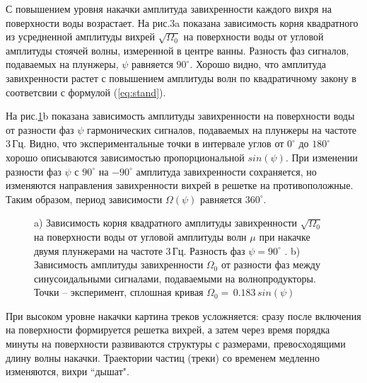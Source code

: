 С повышением уровня накачки амплитуда завихренности каждого вихря на поверхности воды возрастает. На рис.3a показана зависимость корня квадратного из усредненной амплитуды вихрей $\sqrt{\Omega_0}$ на поверхности воды от угловой амплитуды стоячей волны, измеренной в центре ванны. Разность фаз сигналов, подаваемых на плунжеры, $\psi$ равняется $90^\circ$. Хорошо видно, что амплитуда завихренности растет с повышением амплитуды волн по квадратичному закону в соответсвии с формулой (\ref{eq:stand}). 

На рис.\ref{img:ampl_phase}b показана зависимость амплитуды завихренности на поверхности воды от разности фаз $\psi$ гармонических сигналов, подаваемых на плунжеры на частоте 3\,Гц. Видно, что экспериментальные точки в интервале углов от $0^\circ$ до $180^\circ$ хорошо описываются зависимостью пропорциональной $sin(\psi)$. При изменении разности фаз $\psi$ с $90^\circ$ на $-90^\circ$ амплитуда завихренности сохраняется, но изменяются направления завихренности вихрей в решетке на противоположные. Таким образом, период зависимости $\Omega (\psi)$ равняется $360^\circ$. 

\begin{figure}[ht]
  \begin{minipage}[ht]{0.49\linewidth}
  \end{minipage}
  \hfill
  \begin{minipage}[ht]{0.49\linewidth}
  \end{minipage}
  \caption{a) Зависимость корня квадратного амплитуды завихренности $\sqrt{\Omega_0}$ на поверхности воды от угловой амплитуды волн $\mu$ при накачке двумя плунжерами на частоте 3\,Гц. Разность фаз $\psi=90^\circ$ . b) Зависимость амплитуды завихренности $\Omega_0$ от разности фаз между синусоидальными сигналами, подаваемыми на волнопродукторы. Точки – эксперимент, сплошная кривая $\Omega_0 = \,0.183\, sin(\psi)$}
  \label{img:ampl_phase}  
\end{figure}


При высоком уровне накачки картина треков усложняется: сразу после включения на поверхности формируется решетка вихрей, а затем через время порядка минуты на поверхности развиваются структуры с размерами, превосходящими длину волны накачки. Траектории частиц (треки) со временем медленно изменяются, вихри ``дышат". 

